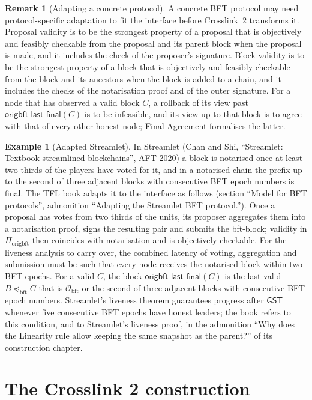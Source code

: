 \documentclass[11pt,a4paper]{article}
\theoremstyle{definition}
\newtheorem{remark}[theorem]{Remark}
\newtheorem{example}[theorem]{Example}
\newcommand{\bft}{\mathrm{bft}}
\newcommand{\Origin}{\mathcal{O}}
\newcommand{\Obft}{\Origin_{\bft}}
\newcommand{\Piorigbft}{\Pi_{\mathrm{origbft}}}
\newcommand{\GST}{\mathsf{GST}}
\newcommand{\origbftlastfinal}{\mathsf{origbft\text{-}last\text{-}final}}
\begin{document}
\begin{remark}[Adapting a concrete protocol]\label{rem:bft-adapt}
A concrete BFT protocol may need protocol-specific adaptation to fit the
interface before Crosslink~2 transforms it. Proposal validity is to be the
strongest property of a proposal that is objectively and feasibly checkable
from the proposal and its parent block when the proposal is made, and it
includes the check of the proposer's signature. Block validity is to be the
strongest property of a block that is objectively and feasibly checkable from
the block and its ancestors when the block is added to a chain, and it
includes the checks of the notarisation proof and of the outer signature.
For a node that has observed a valid block $C$, a rollback of its view past
$\origbftlastfinal(C)$ is to be infeasible, and its view up to that block is
to agree with that of every other honest node; Final Agreement formalises
the latter.
\end{remark}

\begin{example}[Adapted Streamlet]\label{ex:streamlet}
In Streamlet (Chan and Shi, ``Streamlet: Textbook streamlined blockchains'',
AFT 2020) a block is notarised once at least two thirds of the players have
voted for it, and in a notarised chain the prefix up to the second of three
adjacent blocks with consecutive BFT epoch numbers is final. The TFL book adapts
it to the interface as follows (section ``Model for BFT protocols'',
admonition ``Adapting the Streamlet BFT protocol.''). Once a proposal has
votes from two thirds of the units, its proposer aggregates them into a
notarisation proof, signs the resulting pair and submits the bft-block;
validity in $\Piorigbft$ then coincides with notarisation and is objectively
checkable. For the liveness analysis to carry over, the combined latency of
voting, aggregation and submission must be such that every node receives the
notarised block within two BFT epochs. For a valid $C$, the block
$\origbftlastfinal(C)$ is the last valid $B \preceq_{\bft} C$ that is
$\Obft$ or the second of three adjacent blocks with consecutive BFT epoch
numbers. Streamlet's liveness theorem guarantees progress after $\GST$
whenever five consecutive BFT epochs have honest leaders; the book refers to
this condition, and to Streamlet's liveness proof, in the admonition ``Why
does the Linearity rule allow keeping the same snapshot as the parent?'' of
its construction chapter.
\end{example}

\section{The Crosslink 2 construction}\label{sec:cons}
\end{document}
